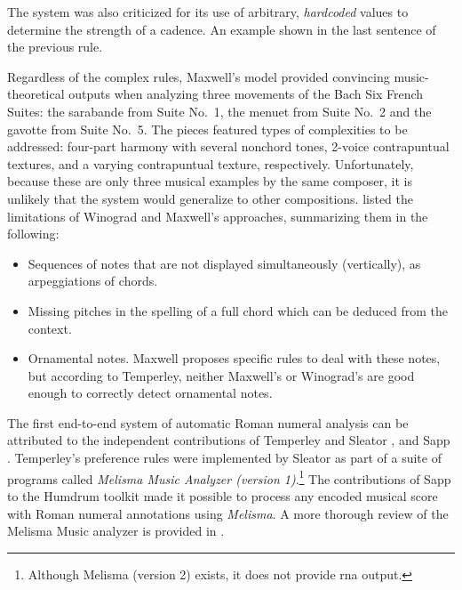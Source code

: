 The system was also criticized for its use of arbitrary,
\emph{hardcoded} values to determine the strength of a
cadence. An example shown in the last sentence of the
previous rule.

Regardless of the complex rules, Maxwell's model provided
convincing music-theoretical outputs when analyzing three
movements of the Bach Six French Suites: the sarabande from
Suite No.~1, the menuet from Suite No.~2 and the gavotte
from Suite No.~5. The pieces featured types of complexities
to be addressed: four-part harmony with several nonchord
tones, 2-voice contrapuntual textures, and a varying
contrapuntual texture, respectively. Unfortunately, because
these are only three musical examples by the same composer,
it is unlikely that the system would generalize to other
compositions. \textcite{temperley1997algorithm} listed the
limitations of Winograd and Maxwell's approaches,
summarizing them in the following:

\begin{itemize}
    \item Sequences of notes that are not displayed
    simultaneously (vertically), as arpeggiations of chords.
    \item Missing pitches in the spelling of a full chord
    which can be deduced from the context.
    \item Ornamental notes. Maxwell proposes specific rules
    to deal with these notes, but according to Temperley,
    neither Maxwell's or Winograd's are good enough to
    correctly detect ornamental notes.
\end{itemize}


The first end-to-end system of automatic Roman numeral
analysis can be attributed to the independent contributions
of Temperley and Sleator \parencite{temperley2004cognition},
and Sapp \parencite{sapp2009tsroot}. Temperley's preference
rules were implemented by Sleator as part of a suite of
programs called \emph{Melisma Music Analyzer (version
1)}.\footnote{Although
Melisma (version 2) exists, it does not provide \gls{rna}
output.} The contributions of Sapp to the Humdrum toolkit
\parencite{huron2002music} made it possible to process any
encoded musical score with Roman numeral annotations using
\emph{Melisma}. A more thorough review of the Melisma Music
analyzer is provided in
\textcite{napoleslopez2017automatic}.


